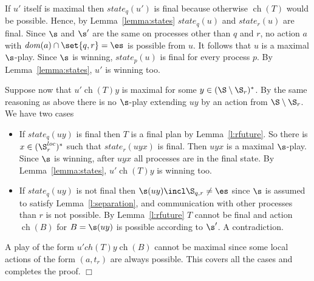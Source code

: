 \documentclass{llncs}
\newcommand{\state}{\mathit{state}}
\newcommand{\loc}{\mathit{dom}}
\newcommand{\ch}{\mathop{ch}}
\renewenvironment{proof}{{\em Proof. }}{\nopagebreak
  \hspace*{\fill}$\Box$}
\begin{document}
\begin{proof}
If $u'$ itself is maximal then $\state_q(u')$ is final because
otherwise $\ch(T)$ would be possible. Hence, by
Lemma~\ref{lemma:states} $\state_q(u)$ and $\state_r(u)$ are
final. Since $\s$ and $\s'$ are the same on processes other than $q$
and $r$, no action $a$ with $\loc(a)\cap \set{q,r}=\es$ is possible
from $u$. It follows that $u$ is a maximal $\s$-play. Since $\s$ is
winning, $\state_p(u)$ is final for every process $p$. By
Lemma~\ref{lemma:states}, $u'$ is winning too.

Suppose now that $u'\ch(T)y$ is maximal for some
$y\in(\S\setminus\S_{r})^*$. By the same reasoning as above there is no
$\s$-play extending $uy$ by an action from $\S \setminus\S_r$. We have two cases
\begin{itemize}
\item If $\state_q(uy)$ is final then $T$ is a final plan by
  Lemma~\ref{l:rfuture}. So there is $x\in(\S^{loc}_r)^*$ such that
  $\state_r(uyx)$ is final. Then $uyx$ is a maximal $\s$-play. Since
  $\s$ is winning, after $uyx$ all processes are in the final state. By
  Lemma~\ref{lemma:states}, $u'\ch(T)y$ is winning too.
\item If $state_q(uy)$ is not final then $\s(uy)\incl
  \S_{q,r}\not=\es$ since $\s$ is assumed to satisfy
  Lemma~\ref{l:separation}, and communication with other processes
  than $r$ is not possible. By Lemma~\ref{l:rfuture} $T$ cannot be
  final and action $\ch(B)$ for $B=\s(uy)$ is possible according to
  $\s'$. A contradiction.
\end{itemize}

A play of the form $u'ch(T)y\ch(B)$ cannot be maximal since some local
actions of the form $(a,t_r)$ are always possible. This covers all the
cases and completes the proof.
\end{proof}
\end{document}
